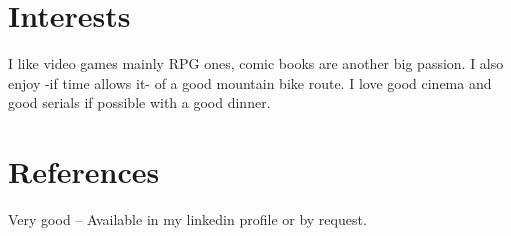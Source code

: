 \documentclass[11pt,a4paper,sans]{moderncv}
\begin{document}
\newpage
\section{Interests}
I like video games mainly RPG ones, comic books are another big passion. I also enjoy -if time allows it- of a good mountain bike route. I love good cinema and good serials if possible with a good dinner.

\section{References}
Very good – Available in my linkedin profile or by request.
\end{document}
